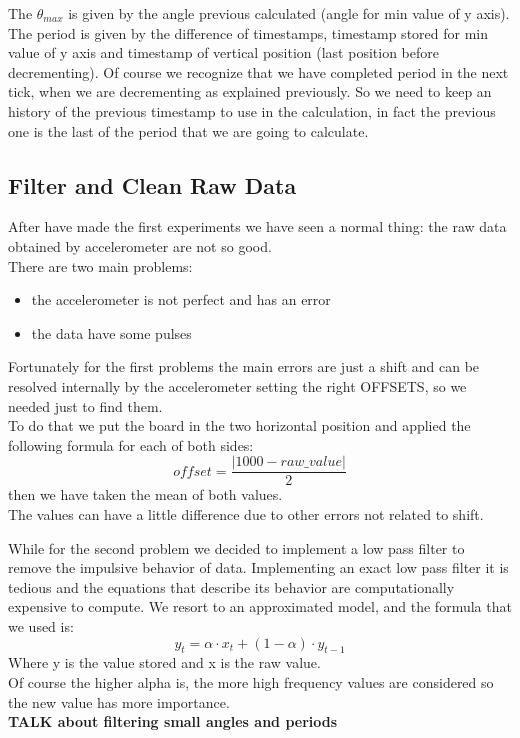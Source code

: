 The $\theta_{max}$ is given by the  angle previous calculated (angle for min value of y axis).\\
The period is given by the difference of timestamps, timestamp stored for min value of y axis and timestamp of vertical position (last position before decrementing).
Of course we recognize that we have completed period in the next tick, when we are decrementing as explained previously. So we need to keep an history of the previous timestamp to use in the calculation, in fact the previous one is the last of the period that we are going to calculate.

\subsection{Filter and Clean Raw Data}
After have made the first experiments we have seen a normal thing: the raw data obtained by accelerometer are not so good.\\
There are two main problems:
\begin{itemize}
	\item the accelerometer is not perfect and has an error
	\item the data have some pulses
\end{itemize} \par

Fortunately for the first problems the main errors are just a shift and can be resolved internally by the accelerometer setting the right OFFSETS, so we needed just to find them.\\
To do that we put the board in the two horizontal position and applied the following formula for each of both sides:
$$ offset = \frac{\left|1000-raw\_value\right|}{2}$$
then we have taken the mean of both values. \\
The values can have a little difference due to other errors not related to shift.\par

While for the second problem we decided to implement a low pass filter to remove the impulsive behavior of data. Implementing an exact low pass filter it is tedious and the equations that describe its behavior are computationally expensive to compute. We resort to an approximated model, and the formula \cite{Holt20045} that we used is:
$$ y_t = \alpha \cdot x_t + (1-\alpha) \cdot y_{t-1}$$
Where y is the value stored and x is the raw value.\\
Of course the higher alpha is, the more high frequency values are considered so the new value has more importance.\\
\textbf{TALK about filtering small angles and periods}

